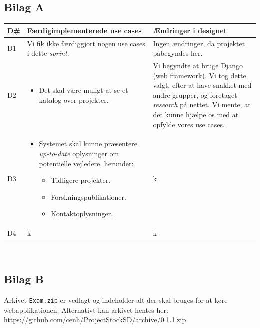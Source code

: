 \documentclass[12pt]{article}
\begin{document}
\subsection{Bilag A}
\label{sec:bilagA}
\begin{center}
	\begin{tabular}{|p{}|p{}|p{}|}
		\hline
	\textbf{D\#} & \textbf{Færdigimplementerede use cases} & \textbf{Ændringer i designet} \\ \hline

	D1 & Vi fik ikke færdiggjort nogen use cases i dette \textit{sprint}. & Ingen ændringer, da projektet påbegyndes her. \\ \hline

	D2 & 		\begin{minipage}[t]{0.4\textwidth}
	\begin{itemize}
		\item Det skal være muligt at se et katalog over projekter.
		\end{itemize}
		\end{minipage} & Vi begyndte at bruge Django (web framework). Vi tog dette valgt, efter at have snakket med andre grupper, og foretaget \textit{research} på nettet. Vi mente, at det kunne hjælpe os med at opfylde vores use cases. \\ \hline

	D3 &
	\begin{minipage}[t]{0.4\textwidth}
	\begin{itemize}
		\item Systemet skal kunne præsentere \textit{up-to-date} oplysninger om potentielle vejledere, herunder:
		\begin{itemize}
			\item Tidligere projekter.
			\item Forskningspublikationer.
			\item Kontaktoplysninger.
		\end{itemize}
	\end{itemize}
	\end{minipage} & k \\
		\hline
	D4 & k & k \\ \hline
	\end{tabular}
\end{center}~\\

\subsection{Bilag B}
\label{sec:bilagB}
Arkivet \texttt{Exam.zip} er vedlagt og indeholder alt der skal bruges for at køre webapplikationen.
Alternativt kan arkivet hentes her:\\
\url{https://github.com/cenh/ProjectStockSD/archive/0.1.1.zip}
\end{document}
